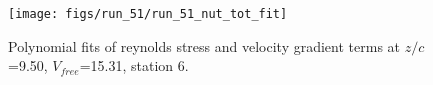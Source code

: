 \begin{figure}[H]
\centering
\texttt{[image: figs/run\_51/run\_51\_nut\_tot\_fit]}
\caption{Polynomial fits of reynolds stress and velocity gradient terms at $z/c$=9.50, $V_{free}$=15.31, station 6.}
\label{fig:run_51_nut_tot_fit}
\end{figure}



